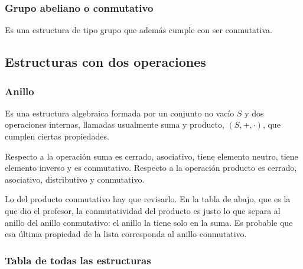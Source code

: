 \documentclass[11pt,letterpaper]{article}
\begin{document}
\subsubsection*{Grupo abeliano o conmutativo}

Es una estructura de tipo grupo que además cumple con ser
conmutativa.


\subsection*{Estructuras con dos operaciones}

\subsubsection*{Anillo}

Es una estructura algebraica formada por un conjunto no vacío $S$ y
dos operaciones internas, llamadas usualmente suma y producto,
$(S, +, \cdot)$, que cumplen ciertas propiedades.

Respecto a la operación suma es cerrado, asociativo, tiene elemento
neutro, tiene elemento inverso y es conmutativo. Respecto a la
operación producto es cerrado, asociativo, distributivo y
conmutativo.

\begin{ojo}
    Lo del producto conmutativo hay que revisarlo. En la tabla de
    abajo, que es la que dio el profesor, la conmutatividad del
    producto es justo lo que separa al anillo del anillo conmutativo:
    el anillo la tiene solo en la suma. Es probable que esa última
    propiedad de la lista corresponda al anillo conmutativo.
\end{ojo}

\subsubsection*{Tabla de todas las estructuras}
\end{document}
